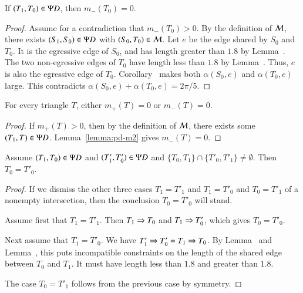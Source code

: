 \begin{lemma}  
If $(T_1,T_0)\in\Psi D$, then $m_-(T_0)=0$.
\end{lemma}

\begin{proof} 
  Assume for a contradiction that $m_-(T_0)>0$.  By the definition
  of $\mathcal M$, there exists $(S_1,S_0)\in\Psi D$ with
  $(S_0,T_0)\in\mathcal M$.  Let $e$ be the edge shared by $S_0$ and
  $T_0$.  It is the egressive edge of $S_0$, and has length greater
  than $1.8$ by Lemma~.  The two non-egressive
  edges of $T_0$ have length less than $1.8$ by
  Lemma~.  Thus, $e$ is also the egressive edge
  of $T_0$.  Corollary~ makes both
  $\alpha(S_0,e)$ and $\alpha(T_0,e)$ large.  This contradicts
  $\alpha(S_0,e)+\alpha(T_0,e)=2\pi/5$.
\end{proof}

\begin{corollary}  
  For every triangle $T$, either $m_+(T)=0$ or $m_-(T)=0$.
\end{corollary}

\begin{proof}  
  If $m_+(T)>0$, then by the definition of $\mathcal M$, there exists some $(T_1,T)\in\Psi D$.  
  Lemma~\ref{lemma:pd-m2} gives $m_-(T)=0$.
\end{proof}

\begin{lemma}  
  Assume $(T_1,T_0)\in \Psi D$ and $(T'_1,T'_0)\in\Psi D$ and
  $\{T_0,T_1\}\cap\{T'_0,T'_1\} \ne \emptyset$.  Then $T_0 = T'_0$.
\end{lemma}

\begin{proof}  
  If we dismiss the other three cases $T_1=T'_1$ and $T_1=T'_0$ and
  $T_0=T'_1$ of a nonempty intersection, then the conclusion $T_0 =
  T'_0$ will stand.

  Assume first that $T_1 = T'_1$.  Then $T_1\Rightarrow T_0$ and $T_1\Rightarrow
  T'_0$, which gives $T_0=T'_0$.

  Next assume that $T_1=T'_0$.  We have $T'_1\Rightarrow T'_0 = T_1 \Rightarrow T_0$.
  By Lemma~ and
  Lemma~, this puts incompatible constraints on the
  length of the shared edge between $T_0$ and $T_1$.  It must have
  length less than $1.8$ and greater than $1.8$.

  The case $T_0=T'_1$ follows from the previous case by symmetry.
\end{proof}

